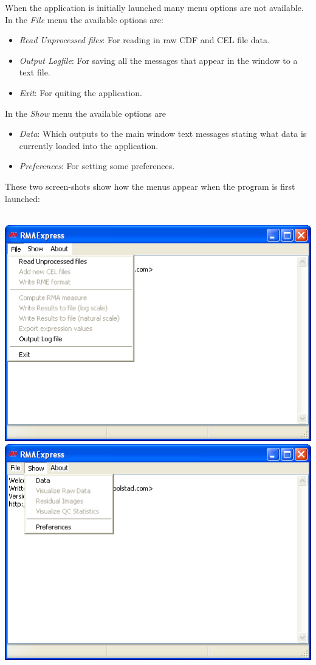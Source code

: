 \documentclass[11pt]{report}
\begin{document}
When the application is initially launched many menu options are not available. In the {\it File} menu the available options are:
\begin{itemize}
\item {\it Read Unprocessed files}: For reading in raw CDF and CEL file data.
\item {\it Output Logfile}: For saving all the messages that appear in the window to a text file.
\item {\it Exit}: For quiting the application.
\end{itemize}
In the {\it Show} menu the available options are\
\begin{itemize}
\item {\it Data}: Which outputs to the main window text messages stating what data is currently loaded into the application. 
\item {\it Preferences}: For setting some preferences. 
\end{itemize}
These two screen-shots show how the menus appear when the program is first launched:\\ \\
\begin{center}
\includegraphics[scale=0.5]{Filemenu1}\\
\includegraphics[scale=0.5]{showmenu}
\end{center}
\end{document}
